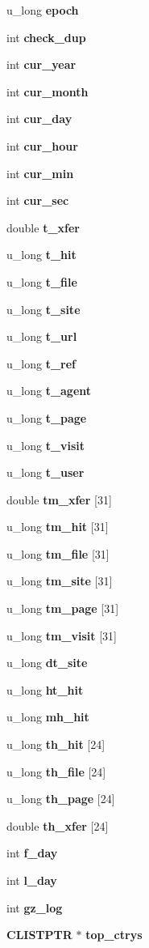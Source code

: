 \begin{CompactItemize}
\item 
u\_\-long {\bf epoch}
\item 
int {\bf check\_\-dup}
\item 
int {\bf cur\_\-year}
\item 
int {\bf cur\_\-month}
\item 
int {\bf cur\_\-day}
\item 
int {\bf cur\_\-hour}
\item 
int {\bf cur\_\-min}
\item 
int {\bf cur\_\-sec}
\item 
double {\bf t\_\-xfer}
\item 
u\_\-long {\bf t\_\-hit}
\item 
u\_\-long {\bf t\_\-file}
\item 
u\_\-long {\bf t\_\-site}
\item 
u\_\-long {\bf t\_\-url}
\item 
u\_\-long {\bf t\_\-ref}
\item 
u\_\-long {\bf t\_\-agent}
\item 
u\_\-long {\bf t\_\-page}
\item 
u\_\-long {\bf t\_\-visit}
\item 
u\_\-long {\bf t\_\-user}
\item 
double {\bf tm\_\-xfer} [31]
\item 
u\_\-long {\bf tm\_\-hit} [31]
\item 
u\_\-long {\bf tm\_\-file} [31]
\item 
u\_\-long {\bf tm\_\-site} [31]
\item 
u\_\-long {\bf tm\_\-page} [31]
\item 
u\_\-long {\bf tm\_\-visit} [31]
\item 
u\_\-long {\bf dt\_\-site}
\item 
u\_\-long {\bf ht\_\-hit}
\item 
u\_\-long {\bf mh\_\-hit}
\item 
u\_\-long {\bf th\_\-hit} [24]
\item 
u\_\-long {\bf th\_\-file} [24]
\item 
u\_\-long {\bf th\_\-page} [24]
\item 
double {\bf th\_\-xfer} [24]
\item 
int {\bf f\_\-day}
\item 
int {\bf l\_\-day}
\item 
int {\bf gz\_\-log}
\item 
{\bf CLISTPTR} $\ast$ {\bf top\_\-ctrys}
\end{CompactItemize}


